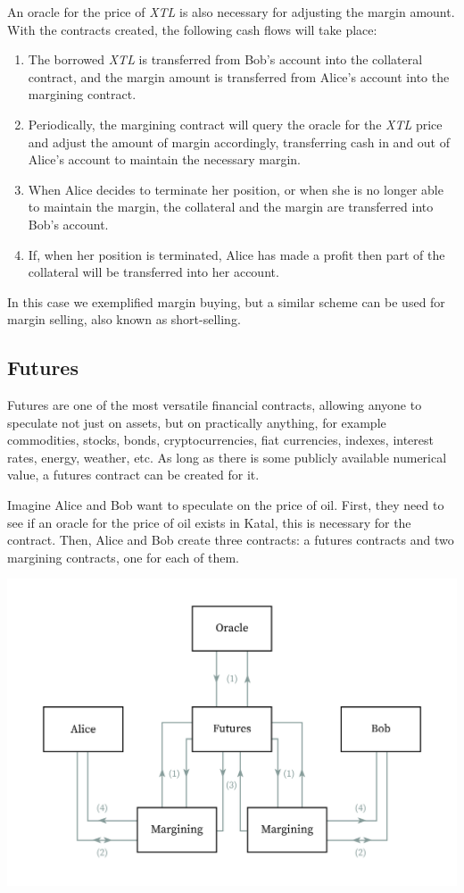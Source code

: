 \documentclass[conference]{IEEEtran}
\begin{document}
An oracle for the price of \textit{XTL} is also necessary for adjusting the margin amount. With the contracts created, the following cash flows will take place:

\begin{enumerate}
	\item The borrowed \textit{XTL} is transferred from Bob's account into the collateral contract, and the margin amount is transferred from Alice's account into the margining contract.
	\item Periodically, the margining contract will query the oracle for the \textit{XTL} price and adjust the amount of margin accordingly, transferring cash in and out of Alice's account to maintain the necessary margin.
	\item When Alice decides to terminate her position, or when she is no longer able to maintain the margin, the collateral and the margin are transferred into Bob's account.
	\item If, when her position is terminated, Alice has made a profit then part of the collateral will be transferred into her account.
\end{enumerate}

In this case we exemplified margin buying, but a similar scheme can be used for margin selling, also known as short-selling.

\subsection{Futures}
Futures are one of the most versatile financial contracts, allowing anyone to speculate not just on assets, but on practically anything, for example commodities, stocks, bonds, cryptocurrencies, fiat currencies, indexes, interest rates, energy, weather, etc. As long as there is some publicly available numerical value, a futures contract can be created for it.

Imagine Alice and Bob want to speculate on the price of oil. First, they need to see if an oracle for the price of oil exists in Katal, this is necessary for the contract. Then, Alice and Bob create three contracts: a futures contracts and two margining contracts, one for each of them.

\includegraphics[width=\linewidth]{images/futures.jpg}
\end{document}
